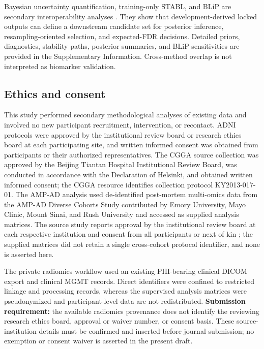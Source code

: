 Bayesian uncertainty quantification, training-only STABL, and BLiP are secondary interoperability analyses \citep{ref25,ref30,ref32,ref33,ref34}. They show that development-derived locked outputs can define a downstream candidate set for posterior inference, resampling-oriented selection, and expected-FDR decisions. Detailed priors, diagnostics, stability paths, posterior summaries, and BLiP sensitivities are provided in the Supplementary Information. Cross-method overlap is not interpreted as biomarker validation.

\subsection{Ethics and consent}

This study performed secondary methodological analyses of existing data and involved no new participant recruitment, intervention, or recontact. ADNI protocols were approved by the institutional review board or research ethics board at each participating site, and written informed consent was obtained from participants or their authorized representatives. The CGGA source collection was approved by the Beijing Tiantan Hospital Institutional Review Board, was conducted in accordance with the Declaration of Helsinki, and obtained written informed consent; the CGGA resource identifies collection protocol KY2013-017-01. The AMP-AD analysis used de-identified post-mortem multi-omics data from the AMP-AD Diverse Cohorts Study contributed by Emory University, Mayo Clinic, Mount Sinai, and Rush University and accessed as supplied analysis matrices. The source study reports approval by the institutional review board at each respective institution and consent from all participants or next of kin \citep{ref37}; the supplied matrices did not retain a single cross-cohort protocol identifier, and none is asserted here.

The private radiomics workflow used an existing PHI-bearing clinical DICOM export and clinical MGMT records. Direct identifiers were confined to restricted linkage and processing records, whereas the supervised analysis matrices were pseudonymized and participant-level data are not redistributed. \textbf{Submission requirement:} the available radiomics provenance does not identify the reviewing research ethics board, approval or waiver number, or consent basis. These source-institution details must be confirmed and inserted before journal submission; no exemption or consent waiver is asserted in the present draft.

